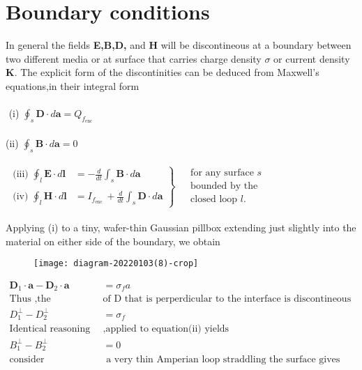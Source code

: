 \section{Boundary conditions}
In general the fields \textbf{E,B,D,} and \textbf{H} will be discontineous at a boundary between two different media or at surface that carries charge density $\sigma$ or current density \textbf{K}. The explicit form of the discontinities can be deduced from Maxwell's equations,in their integral form\\\\
$\left. \right. $\hspace{0.28cm} (i) $\oint_s \mathbf{D} \cdot d \mathbf{a}=Q_{f_{\mathrm{enc}}}$\\\\
$\left. \right. $\hspace{0.3cm}(ii) $\oint_s \mathbf{B} \cdot d \mathbf{a}=0$\\\\
$\left.\begin{array}{ll}\text { (iii) } \oint_l \mathbf{E} \cdot d \mathbf{l} & =-\frac{d}{d t} \int_s \mathbf{B} \cdot d \mathbf{a} \\ \\
\text { (iv) } \oint_l \mathbf{H} \cdot d \mathbf{l} & =I_{f_{\text {enc }}}+\frac{d}{d t} \int_s \mathbf{D} \cdot d \mathbf{a}\end{array}\right\} \begin{aligned}&\text { for any surface } s \\&\text { bounded by the } \\&\text { closed loop } l .\end{aligned}$\\\\
Applying (i) to a tiny, wafer-thin Gaussian pillbox extending just slightly into the material on either side of the boundary, we obtain \\
\begin{figure}[H]
	\centering
	\texttt{[image: diagram-20220103(8)-crop]}
	\caption{}
	\label{}
\end{figure}
\begin{align*}
\mathbf{D}_{1} \cdot \mathbf{a}-\mathbf{D}_{2} \cdot \mathbf{a}&=\sigma_{f} a\\
\text{Thus ,the component }&\text{of D that is perperdicular to the interface is discontineous in the amount }\\
D_{1}^{\perp}-D_{2}^{\perp}&=\sigma_{f}\\
\text{Identical reasoning }&\text{,applied to equation(ii) yields}\\
B_1^{\perp}-B_2^{\perp}&=0\\
\text{consider equation(iii)}&\text{ a very thin Amperian loop straddling the surface gives}
\end{align*}
